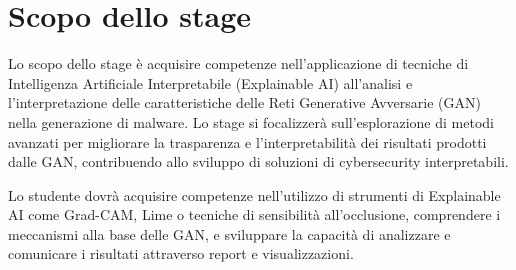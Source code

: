 \section*{Scopo dello stage}
Lo scopo dello stage è acquisire competenze nell'applicazione di tecniche di Intelligenza Artificiale Interpretabile (Explainable AI) all'analisi e l'interpretazione delle caratteristiche delle Reti Generative Avversarie (GAN) nella generazione di malware. Lo stage si focalizzerà sull'esplorazione di metodi avanzati per migliorare la trasparenza e l'interpretabilità dei risultati prodotti dalle GAN, contribuendo allo sviluppo di soluzioni di cybersecurity interpretabili.

Lo studente dovrà acquisire competenze nell'utilizzo di strumenti di Explainable AI come Grad-CAM, Lime o tecniche di sensibilità all'occlusione, comprendere i meccanismi alla base delle GAN, e sviluppare la capacità di analizzare e comunicare i risultati attraverso report e visualizzazioni.


